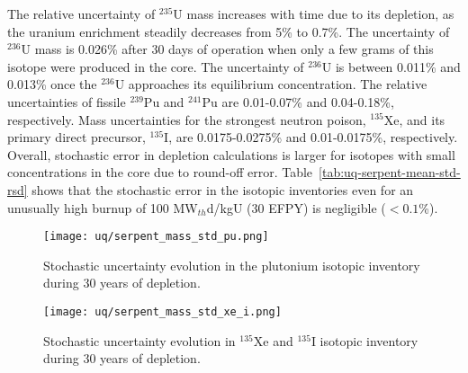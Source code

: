 The relative uncertainty of $^{235}$U mass increases with time due to its 
depletion, as the uranium enrichment steadily decreases from 5\% to 0.7\%.
The uncertainty of $^{236}$U mass is 
0.026\% after 30 days of operation when only a few grams of this isotope were 
produced in the core. The uncertainty of $^{236}$U is between 0.011\% and 
0.013\% once the $^{236}$U approaches its equilibrium concentration. The 
relative uncertainties of fissile $^{239}$Pu and $^{241}$Pu are 0.01-0.07\% 
and 0.04-0.18\%, respectively. Mass uncertainties for the 
strongest neutron poison, $^{135}$Xe, and its primary direct precursor, 
$^{135}$I, are 0.0175-0.0275\% and 0.01-0.0175\%, respectively. Overall, 
stochastic error in depletion calculations is larger for isotopes with small 
concentrations in the core due to round-off error. 
Table~\ref{tab:uq-serpent-mean-std-rsd} shows that the stochastic error in the 
isotopic inventories even for an unusually high burnup of 100 MW$_{th}$d/kgU 
(30 EFPY) is negligible ($<0.1$\%).

\begin{figure}[htp!] %
	\centering
	\texttt{[image: uq/serpent\_mass\_std\_pu.png]}
	\vspace{-3mm}
	\caption{Stochastic uncertainty evolution in the plutonium isotopic 
		inventory during 30 years of depletion.}
	\label{fig:uq-serpent-pu}
\end{figure}
\vspace{-9mm}
\begin{figure}[hbp!] %
	\centering
	\texttt{[image: uq/serpent\_mass\_std\_xe\_i.png]}
	\vspace{-3mm}
	\caption{Stochastic uncertainty evolution in $^{135}$Xe and $^{135}$I 
		isotopic inventory during 30 years of depletion.}
	\label{fig:uq-serpent-xe-i}
\end{figure}


